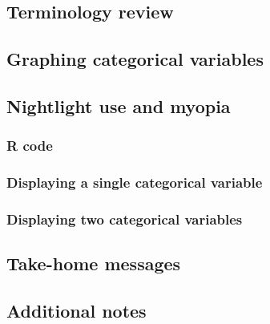\documentclass[
]{report}
\begin{document}
\hypertarget{terminology-review-4}{%
\subsection{Terminology review}\label{terminology-review-4}}

\hypertarget{graphing-categorical-variables}{%
\subsection{Graphing categorical variables}\label{graphing-categorical-variables}}

\hypertarget{nightlight-use-and-myopia}{%
\subsection*{Nightlight use and myopia}\label{nightlight-use-and-myopia}}

\hypertarget{r-code}{%
\subsubsection*{R code}\label{r-code}}

\hypertarget{displaying-a-single-categorical-variable}{%
\subsubsection*{Displaying a single categorical variable}\label{displaying-a-single-categorical-variable}}

\hypertarget{displaying-two-categorical-variables}{%
\subsubsection*{Displaying two categorical variables}\label{displaying-two-categorical-variables}}

\hypertarget{take-home-messages-4}{%
\subsection{Take-home messages}\label{take-home-messages-4}}

\hypertarget{additional-notes-4}{%
\subsection{Additional notes}\label{additional-notes-4}}
\end{document}
